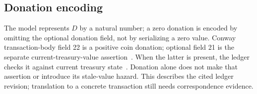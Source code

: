 \subsection{Donation encoding}
The model represents $D$ by a natural number; a zero donation is encoded by
omitting the optional donation field, not by serializing a zero value.
Conway transaction-body field 22 is a positive coin donation; optional field
21 is the separate current-treasury-value assertion~\cite{ConwayCDDL}.
When the latter is present, the ledger checks it against current treasury
state~\cite{ConwayLedger}. Donation alone does not make that assertion or
introduce its stale-value hazard. This describes the cited ledger revision;
translation to a concrete transaction still needs correspondence evidence.
